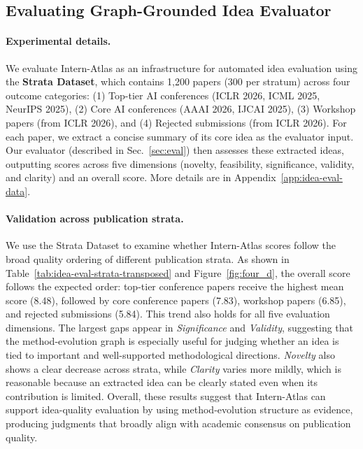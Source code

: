 \documentclass{llmxive}
\begin{document}
\subsection{Evaluating Graph-Grounded Idea Evaluator}
\label{exp02}

\paragraph{Experimental details.}
We evaluate Intern-Atlas as an infrastructure for automated idea evaluation using the \textbf{Strata Dataset}, which contains 1,200 papers (300 per stratum) across four outcome categories: (1) Top-tier AI conferences (ICLR 2026, ICML 2025, NeurIPS 2025), (2) Core AI conferences (AAAI 2026, IJCAI 2025), (3) Workshop papers (from ICLR 2026), and (4) Rejected submissions (from ICLR 2026). For each paper, we extract a concise summary of its core idea as the evaluator input. Our evaluator (described in Sec.~\ref{sec:eval}) then assesses these extracted ideas, outputting scores across five dimensions (novelty, feasibility, significance, validity, and clarity) and an overall score. More details are in Appendix~\ref{app:idea-eval-data}.

\paragraph{Validation across publication strata.}
We use the Strata Dataset to examine whether Intern-Atlas scores follow the broad quality ordering of different publication strata. As shown in Table~\ref{tab:idea-eval-strata-transposed} and Figure~\ref{fig:four_d}, the overall score follows the expected order: top-tier conference papers receive the highest mean score (8.48), followed by core conference papers (7.83), workshop papers (6.85), and rejected submissions (5.84). This trend also holds for all five evaluation dimensions. The largest gaps appear in \textit{Significance} and \textit{Validity}, suggesting that the method-evolution graph is especially useful for judging whether an idea is tied to important and well-supported methodological directions. \textit{Novelty} also shows a clear decrease across strata, while \textit{Clarity} varies more mildly, which is reasonable because an extracted idea can be clearly stated even when its contribution is limited. Overall, these results suggest that Intern-Atlas can support idea-quality evaluation by using method-evolution structure as evidence, producing judgments that broadly align with academic consensus on publication quality.
\end{document}
